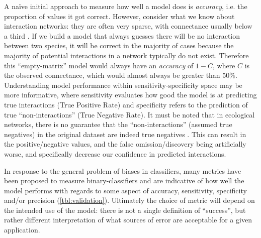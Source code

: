A naïve initial approach to measure how well a model does is
\emph{accuracy}, i.e. the proportion of values it got correct. However,
consider what we know about interaction networks: they are often very
sparse, with connectance usually below a third \cite{Cohen1990ComFoo}.
If we build a model that always guesses there will be no interaction
between two species, it will be correct in the majority of cases because
the majority of potential interactions in a network typically do not
exist. Therefore this ``empty-matrix'' model would always have an
\emph{accuracy} of \(1-C\), where \(C\) is the observed connectance,
which would almost always be greater than 50\%. Understanding model
performance within sensitivity-specificity space may be more
informative, where sensitivity evaluates how good the model is at
predicting true interactions (True Positive Rate) and specificity refers
to the prediction of true ``non-interactions'' (True Negative Rate). It
must be noted that in ecological networks, there is no guarantee that
the ``non-interactions'' (assumed true negatives) in the original
dataset are indeed true negatives \cite{Jordano2016ChaEco,
Jordano2016SamNet}. This can result in the positive/negative values,
and the false omission/discovery being artificially worse, and
specifically decrease our confidence in predicted interactions.

In response to the general problem of biases in classifiers, many
metrics have been proposed to measure binary-classifiers
\cite{Gu2009EvaMea, Drummond2006CosCur} and are indicative of how well
the model performs with regards to some aspect of accuracy, sensitivity,
specificity and/or precision (\autoref{tbl:validation}). Ultimately the choice of
metric will depend on the intended use of the model: there is not a
single definition of ``success'', but rather different interpretation of
what sources of error are acceptable for a given application.

